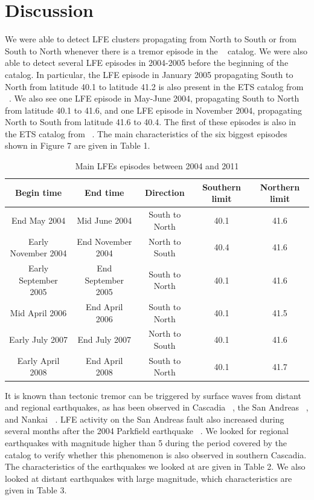 \documentclass[draft]{agujournal2019}
\begin{document}
\section{Discussion}

We were able to detect LFE clusters propagating from North to South or from South to North whenever there is a tremor episode in the ~ catalog. We were also able to detect several LFE episodes in 2004-2005 before the beginning of the ~ catalog. In particular, the LFE episode in January 2005 propagating South to North from latitude 40.1 to latitude 41.2 is also present in the ETS catalog from ~. We also see one LFE episode in May-June 2004, propagating South to North from latitude 40.1 to 41.6, and one LFE episode in November 2004, propagating North to South from latitude 41.6 to 40.4. The first of these episodes is also in the ETS catalog from ~. The main characteristics of the six biggest episodes shown in Figure 7 are given in Table 1. \\

\begin{table}
\caption{Main LFEs episodes between 2004 and 2011}
\centering
\begin{tabular}{c c c c c}
\hline
Begin time & End time & Direction & Southern limit & Northern limit \\
\hline
End May 2004 & Mid June 2004 & South to North & 40.1 & 41.6 \\
Early November 2004 & End November 2004 & North to South & 40.4 & 41.6 \\
Early September 2005 & End September 2005 & South to North & 40.1 & 41.6 \\
Mid April 2006 & End April 2006 & South to North & 40.1 & 41.5 \\
Early July 2007 & End July 2007 & North to South & 40.1 & 41.6 \\
Early April 2008 & End April 2008 & South to North & 40.1 & 41.7 \\
\hline
\end{tabular}
\end{table}

It is known than tectonic tremor can be triggered by surface waves from distant and regional earthquakes, as has been observed in Cascadia ~\cite{RUB_2009}, the San Andreas ~\cite{PEN_2009, GUI_2010}, and Nankai \textbf{~\cite{MIY_2008,HAN_2014}}. LFE activity on the San Andreas fault also increased during several months after the 2004 Parkfield earthquake ~\cite{SHE_2017}. We looked for regional earthquakes with magnitude higher than 5 during the period covered by the catalog to verify whether this phenomenon is also observed in southern Cascadia. The characteristics of the earthquakes we looked at are given in Table 2. We also looked at distant earthquakes with large magnitude, which  characteristics are given in Table 3. \\
\end{document}
